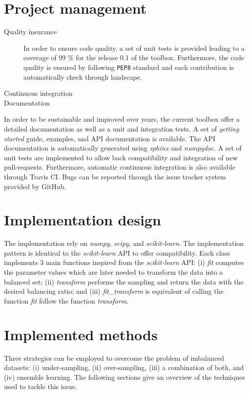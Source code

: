 \documentclass[twoside,11pt]{article}
\begin{document}
\section{Project management}

\begin{description}
  \item[Quality insurance] In order to ensure code quality, a set of unit tests is provided leading to a coverage of 99 \% for the release 0.1 of the toolbox. Furthermore, the code quality is ensured by following \texttt{PEP8} standard and each contribution is automatically check through landscape.
  \item[Continuous integration]
  \item[Documentation]
\end{description}

In order to be sustainable and improved over years, the current toolbox offer a detailed documentation as well as a unit and integration tests.
A set of \emph{getting started} guide, examples, and API documentation is available.
The API documentation is automatically generated using \emph{sphinx} and \emph{numpydoc}.
A set of unit tests are implemented to allow back compatibility and integration of new pull-requests.
Furthermore, automatic continuous integration is also available through Travis CI.
Bugs can be reported through the issue tracker system provided by GitHub.

\section{Implementation design}

The implementation rely on \emph{numpy}, \emph{scipy}, and \emph{scikit-learn}.
The implementation pattern is identical to the \emph{scikit-learn} API to offer compatibility.
Each class implements 3 main functions inspired from the \emph{scikit-learn} API:
(i) \emph{fit} computes the parameter values which are later needed to transform the data into a balanced set;
(ii) \emph{transform} performs the sampling and return the data with the desired balancing ratio;
and (iii) \emph{fit\_transform} is equivalent of calling the function \emph{fit} follow the function \emph{transform}.

\section{Implemented methods}

Three strategies can be employed to overcome the problem of imbalanced datasets: 
(i) under-sampling, (ii) over-sampling, (iii) a combination of both, and (iv) ensemble learning.
The following sections give an overview of the techniques used to tackle this issue.
\end{document}
